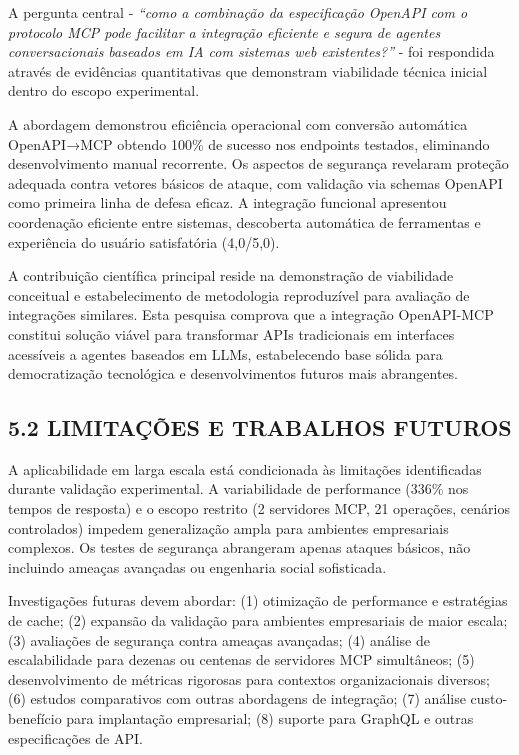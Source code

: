 \documentclass[
]{article}
\begin{document}
A pergunta central - \emph{``como a combinação da especificação OpenAPI
com o protocolo MCP pode facilitar a integração eficiente e segura de
agentes conversacionais baseados em IA com sistemas web existentes?''} -
foi respondida através de evidências quantitativas que demonstram
viabilidade técnica inicial dentro do escopo experimental.

A abordagem demonstrou eficiência operacional com conversão automática
OpenAPI→MCP obtendo 100\% de sucesso nos endpoints testados, eliminando
desenvolvimento manual recorrente. Os aspectos de segurança revelaram
proteção adequada contra vetores básicos de ataque, com validação via
schemas OpenAPI como primeira linha de defesa eficaz. A integração
funcional apresentou coordenação eficiente entre sistemas, descoberta
automática de ferramentas e experiência do usuário satisfatória
(4,0/5,0).

A contribuição científica principal reside na demonstração de
viabilidade conceitual e estabelecimento de metodologia reproduzível
para avaliação de integrações similares. Esta pesquisa comprova que a
integração OpenAPI-MCP constitui solução viável para transformar APIs
tradicionais em interfaces acessíveis a agentes baseados em LLMs,
estabelecendo base sólida para democratização tecnológica e
desenvolvimentos futuros mais abrangentes.

\subsection{5.2 LIMITAÇÕES E TRABALHOS
FUTUROS}\label{limitauxe7uxf5es-e-trabalhos-futuros}

A aplicabilidade em larga escala está condicionada às limitações
identificadas durante validação experimental. A variabilidade de
performance (336\% nos tempos de resposta) e o escopo restrito (2
servidores MCP, 21 operações, cenários controlados) impedem
generalização ampla para ambientes empresariais complexos. Os testes de
segurança abrangeram apenas ataques básicos, não incluindo ameaças
avançadas ou engenharia social sofisticada.

Investigações futuras devem abordar: (1) otimização de performance e
estratégias de cache; (2) expansão da validação para ambientes
empresariais de maior escala; (3) avaliações de segurança contra ameaças
avançadas; (4) análise de escalabilidade para dezenas ou centenas de
servidores MCP simultâneos; (5) desenvolvimento de métricas rigorosas
para contextos organizacionais diversos; (6) estudos comparativos com
outras abordagens de integração; (7) análise custo-benefício para
implantação empresarial; (8) suporte para GraphQL e outras
especificações de API.
\end{document}
